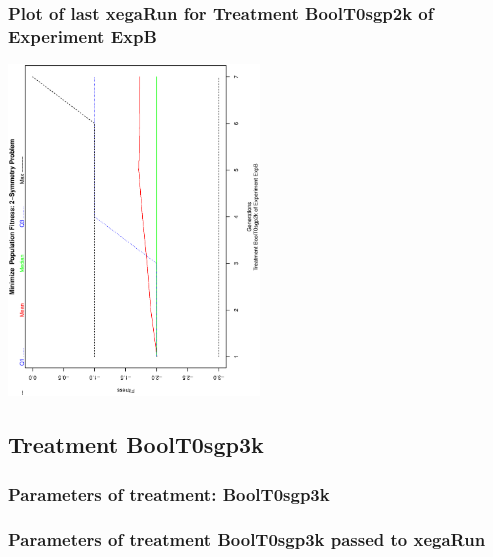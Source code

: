 \documentclass[18pt,c]{beamer}
\makeatletter
\def\beamer@writeslidentry@miniframesoff{%
  \expandafter\beamer@ifempty\expandafter{\beamer@framestartpage}{}%
  {%
   \clearpage\beamer@notesactions%
  }
}
\newcommand*{\miniframesoff}{\let\beamer@writeslidentry=\beamer@writeslidentry@miniframesoff}
\makeatother
\begin{document}
 \begin{frame}
 \frametitle{ Plot of last xegaRun for Treatment BoolT0sgp2k of Experiment ExpB }
 \begin{center}
\includegraphics[width=0.5\textwidth, angle=-90]
{ExpBPlotPopStatsFigure000.eps}
 \end{center}
 \label{report/ExpBPlotPopStatsFigure000.eps}  
 \end{frame}

\miniframesoff
\subsection{Treatment BoolT0sgp3k}

 \begin{frame}
 \fontsize{8pt}{9pt}\selectfont
 \frametitle{  Parameters of treatment: BoolT0sgp3k 
 }

 \label{ExpBtParmTable004.tex}  
 \end{frame}


 \begin{frame}
 \fontsize{8pt}{9pt}\selectfont
 \frametitle{  Parameters of treatment BoolT0sgp3k passed to xegaRun
 }

 \label{ExpBtParmTable005.tex}  
 \end{frame}
\end{document}

